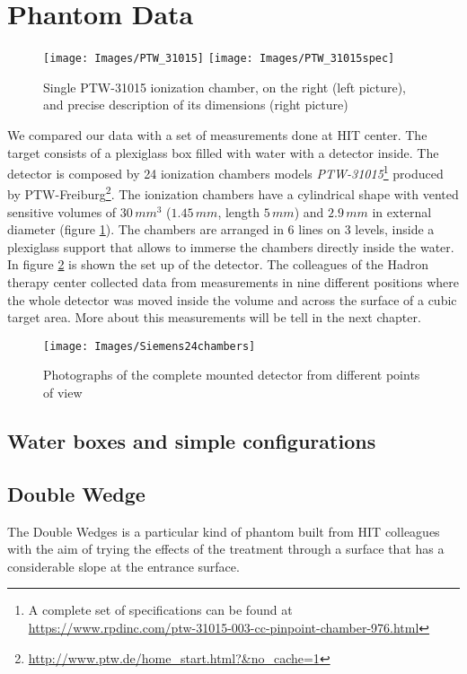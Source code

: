 \documentclass[12pt, a4paper, twoside]{book}
\begin{document}
\section{Phantom Data}
\begin{figure}[h]
{\texttt{[image: Images/PTW\_31015]}}
{\texttt{[image: Images/PTW\_31015spec]}}
\caption{Single PTW-31015 ionization chamber, on the right (left picture), and precise description of its dimensions (right picture)}
\label{fig:31015}
\end{figure}
We compared our data with a set of measurements done at HIT center. The target consists of a plexiglass box filled with water with a detector inside. The detector is composed by 24 ionization chambers models \emph{PTW-31015}\footnote{A complete set of specifications can be found at \url{https://www.rpdinc.com/ptw-31015-003-cc-pinpoint-chamber-976.html}} produced by PTW-Freiburg\footnote{\url{http://www.ptw.de/home_start.html?&no_cache=1}}. The ionization chambers have a cylindrical shape with vented sensitive volumes of $30\,mm^3$ ($1.45\,mm$, length $5\,mm$) and $2.9\,mm$ in external diameter (figure \ref{fig:31015}).
The chambers are arranged in 6 lines on 3 levels, inside a plexiglass support that allows to immerse the chambers directly inside the water. In figure \ref{fig:24cham} is shown the set up of the detector.
The colleagues of the Hadron therapy center collected data from measurements in nine different positions where the whole detector was moved inside the volume and across the surface of a cubic target area. More about this measurements will be tell in the next chapter.

\begin{figure}[h]
{\texttt{[image: Images/Siemens24chambers]}}
\caption{Photographs of the complete mounted detector from different points of view}
\label{fig:24cham}
\end{figure}
\subsection{Water boxes and simple configurations}
\subsection{Double Wedge}
The Double Wedges is a particular kind of phantom built from HIT colleagues with the aim of trying the effects of the treatment through a surface that has a considerable slope at the entrance surface. %
\end{document}
